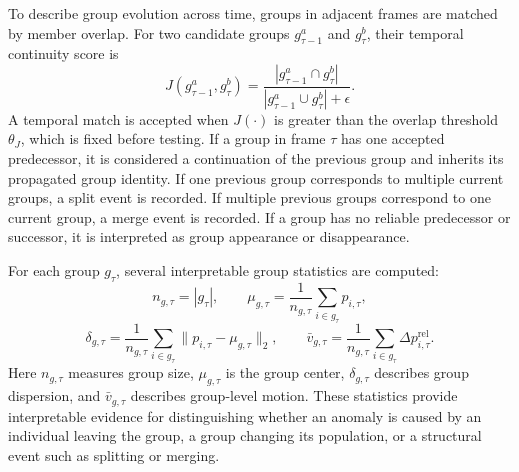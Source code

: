 To describe group evolution across time, groups in adjacent frames are matched by member overlap. For two candidate groups \(g_{\tau-1}^{a}\) and \(g_{\tau}^{b}\), their temporal continuity score is
\begin{equation}
  J(g_{\tau-1}^{a},g_{\tau}^{b})
  =
  \frac{|g_{\tau-1}^{a}\cap g_{\tau}^{b}|}
  {|g_{\tau-1}^{a}\cup g_{\tau}^{b}|+\epsilon}.
\end{equation}
A temporal match is accepted when \(J(\cdot)\) is greater than the overlap threshold \(\theta_J\), which is fixed before testing. If a group in frame \(\tau\) has one accepted predecessor, it is considered a continuation of the previous group and inherits its propagated group identity. If one previous group corresponds to multiple current groups, a split event is recorded. If multiple previous groups correspond to one current group, a merge event is recorded. If a group has no reliable predecessor or successor, it is interpreted as group appearance or disappearance.

For each group \(g_{\tau}\), several interpretable group statistics are computed:
\begin{equation}
  n_{g,\tau}=|g_{\tau}|,\qquad
  \mu_{g,\tau}=\frac{1}{n_{g,\tau}}\sum_{i\in g_{\tau}}p_{i,\tau},
\end{equation}
\begin{equation}
  \delta_{g,\tau}=
  \frac{1}{n_{g,\tau}}\sum_{i\in g_{\tau}}\|p_{i,\tau}-\mu_{g,\tau}\|_2,
  \qquad
  \bar{v}_{g,\tau}=
  \frac{1}{n_{g,\tau}}\sum_{i\in g_{\tau}}\Delta p^{\mathrm{rel}}_{i,\tau}.
\end{equation}
Here \(n_{g,\tau}\) measures group size, \(\mu_{g,\tau}\) is the group center, \(\delta_{g,\tau}\) describes group dispersion, and \(\bar{v}_{g,\tau}\) describes group-level motion. These statistics provide interpretable evidence for distinguishing whether an anomaly is caused by an individual leaving the group, a group changing its population, or a structural event such as splitting or merging.

